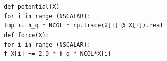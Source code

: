 \documentclass[11pt]{article}
\newcommand\tab[1][1cm]{\hspace*{#1}}
\begin{document}
\begin{footnotesize} 

\begin{mdframed}[backgroundcolor=blue!3] 
 \verb"def potential(X):" \\
 \tab	\verb"for i in range (NSCALAR):" \\ 
    \tab     \tab	\verb"tmp += h_q * NCOL * np.trace(X[i] @ X[i]).real" \\
    
\vspace{5mm} 
\noindent
\verb"def force(X):" \\ 
\tab	\verb"for i in range (NSCALAR):"  \\ 
       \tab  \tab 	\verb"f_X[i] += 2.0 * h_q * NCOL*X[i] "  

\end{mdframed}
\end{footnotesize}


\end{document}
